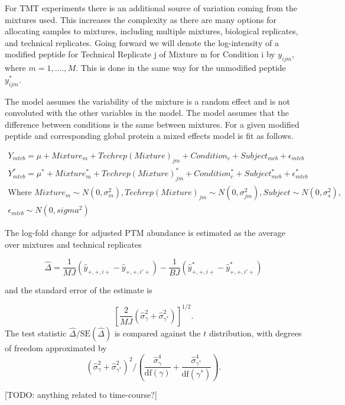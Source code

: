 \documentclass{mcp}
\def\todo#1{{\color{red}[TODO: #1]}}
\begin{document}
For TMT experiments there is an additional source of variation coming from the mixtures used. This increases the complexity as there are many options for allocating samples to mixtures, including multiple mixtures, biological replicates, and technical replicates. Going forward we will denote the log-intensity of a modified peptide for Technical Replicate j of Mixture m for Condition i by $y_{ijm}$, where $m = 1,....,M$. This is done in the same way for the unmodified peptide $y^*_{ijm}$.

The model assumes the variability of the mixture is a random effect and is not convoluted with the other variables in the model. The model assumes that the difference between conditions is the same between mixtures. For a given modified peptide and corresponding global protein a mixed effects model is fit as follows.

\begin{align*}
Y_{mtcb} = \mu + Mixture_m + Techrep(Mixture)_{jm} + Condition_c + Subject_{mcb} + \epsilon_{mtcb}\\
Y^*_{mtcb} = \mu^* + Mixture^*_m + Techrep(Mixture)^*_{jm} + Condition^*_c + Subject^*_{mcb} + \epsilon^*_{mtcb}
\end{align*}
\begin{gather*}
\text{Where }  Mixture_m \sim N(0, \sigma^2_m), Techrep(Mixture)_{jm} \sim N(0, \sigma^2_{jm}), Subject \sim N(0, \sigma^2_{s}), \\
\epsilon_{mtcb} \sim N(0, sigma^2)
\end{gather*}

The log-fold change for adjusted PTM abundance is estimated as the average over mixtures and technical replicates

$$\hat{\Delta} = \frac{1}{MJ} \left( \hat{y}_{+,+,i+} - \hat{y}_{+,+,i'+} \right) - \frac{1}{BJ} \left( \hat{y}_{+,+,i+}^{\ast} - \hat{y}_{+,+,i'+}^{\ast} \right)$$

and the standard error of the estimate is 

\[
\left[ \frac{2}{MJ} \left( \hat{\sigma}_{\gamma}^{2} + \hat{\sigma}_{\gamma^{\ast}}^{2} \right) \right] ^{1/2}.
\]
The test statistic $\hat{\Delta} / \mathrm{SE}(\hat{\Delta})$ is compared against the $t$ distribution, with degrees of freedom approximated by
\[
\left( \hat{\sigma}_{\gamma}^{2} + \hat{\sigma}_{\gamma^{\ast}}^{2} \right)^2 \bigg/
\left( \frac{\hat{\sigma}_{\gamma}^{4}}{  \mathrm{df}(\gamma)} + \frac{\hat{\sigma}_{\gamma^{\ast}}^{4}}{\mathrm{df}(\gamma^{\ast})} \right).
\]

\todo{anything related to time-course?}
\end{document}

